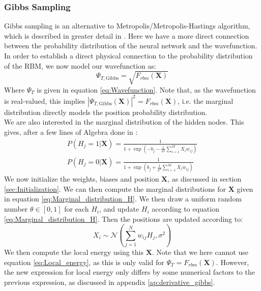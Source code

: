 \documentclass[a4paper, 10pt]{article}
\begin{document}
	\subsubsection{Gibbs Sampling}
	Gibbs sampling is an alternative to Metropolis/Metropolis-Hastings algorithm, which is described in greater detail in \cite{Wang2014}. Here we have a more direct connection between the probability distribution of the neural network and the wavefunction. In order to establish a direct physical connection to the probability distribution of the RBM, we now model our wavefunction as:
	\begin{equation}\label{eq:wavefunction_Gibbs}
	\Psi_{T, \mathrm{Gibbs}} =\sqrt{F_{rbm}(\boldsymbol{X})}
	\end{equation}
	Where $\Psi_T$ is given in equation \ref{eq:Wavefunction}. Note that, as the wavefunction is real-valued, this implies $|\Psi_{T, \mathrm{Gibbs}}(\boldsymbol{X})|^2 = F_{rbm}(\boldsymbol{X})$, i.e. the marginal distribution directly models the position probability distribution.\\
	\linebreak
	We are also interested in the marginal distribution of the hidden nodes. This gives, after a few lines of Algebra done in \cite{Hjorth-Jensen2018}:
	\begin{equation}\label{eq:Marginal_distribution_H}
	\begin{split}
	P(H_j=1|\boldsymbol{X})=\frac{1}{1+\exp\left(-b_j-\frac{1}{\sigma^2}\sum_{i=1}^M X_i w_{ij}\right)}\\
	P(H_j=0|\boldsymbol{X})=\frac{1}{1+\exp\left(b_j+\frac{1}{\sigma^2}\sum_{i=1}^M X_i w_{ij}\right)}
	\end{split}
	\end{equation}
	We now initialize the weights, biases and position $\boldsymbol{X}$, as discussed in section \ref{sec:Initialization}. We can then compute the marginal distributions for $\boldsymbol{X}$ given in equation \ref{eq:Marginal_distribution_H}. We then draw a uniform random number $\theta \in [0,1]$ for each $H_i$, and update $H_i$ according to equation \ref{eq:Marginal_distribution_H}. Then the positions are updated according to:
	\begin{equation}
	X_i\sim \mathcal{N}\left(\sum_{j=1}^Nw_{ij}H_j, \sigma^2\right)
	\end{equation}
	We then compute the local energy using this $\boldsymbol{X}$. Note that we here cannot use equation \ref{eq:Local_energy}, as this is only valid for $\Psi_T = F_{rbm}(\boldsymbol{X})$. However, the new expression for local energy only differs by some numerical factors to the previous expression, as discussed in appendix \ref{ap:derivative_gibbs}. 
\end{document}

